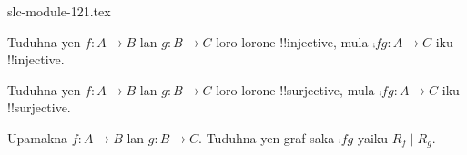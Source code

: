 \begin{filecontents*}[overwrite]{slc-module-121.tex}
\begin{prob}
Tuduhna yen $f \colon A \to B$ lan $g \colon B \to C$ loro-lorone
!!{injective}, mula $\comp{f}{g}\colon A \to C$ iku !!{injective}.
\end{prob}

\begin{prob}
Tuduhna yen $f \colon A \to B$ lan $g \colon B \to C$ loro-lorone
!!{surjective}, mula $\comp{f}{g}\colon A \to C$ iku !!{surjective}.
\end{prob}

\begin{prob}
Upamakna $f \colon A \to B$ lan $g \colon B \to C$. Tuduhna yen graf
saka $\comp{f}{g}$ yaiku $R_f \mid R_g$.
\end{prob}


\end{filecontents*}

